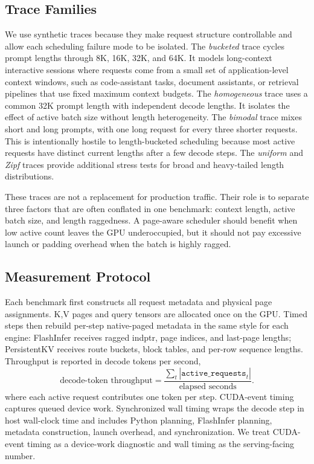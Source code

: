 \documentclass[10pt]{article}
\begin{document}
\subsection{Trace Families}

We use synthetic traces because they make request structure controllable and
allow each scheduling failure mode to be isolated. The \emph{bucketed} trace
cycles prompt lengths through 8K, 16K, 32K, and 64K. It models long-context
interactive sessions where requests come from a small set of application-level
context windows, such as code-assistant tasks, document assistants, or retrieval
pipelines that use fixed maximum context budgets. The \emph{homogeneous} trace
uses a common 32K prompt length with independent decode lengths. It isolates
the effect of active batch size without length heterogeneity. The
\emph{bimodal} trace mixes short and long prompts, with one long request for
every three shorter requests. This is intentionally hostile to length-bucketed
scheduling because most active requests have distinct current lengths after a
few decode steps. The \emph{uniform} and \emph{Zipf} traces provide additional
stress tests for broad and heavy-tailed length distributions.

These traces are not a replacement for production traffic. Their role is to
separate three factors that are often conflated in one benchmark: context
length, active batch size, and length raggedness. A page-aware scheduler should
benefit when low active count leaves the GPU underoccupied, but it should not
pay excessive launch or padding overhead when the batch is highly ragged.

\subsection{Measurement Protocol}

Each benchmark first constructs all request metadata and physical page
assignments. K,V pages and query tensors are allocated once on the GPU. Timed
steps then rebuild per-step native-paged metadata in the same style for each
engine: FlashInfer receives ragged indptr, page indices, and last-page lengths;
PersistentKV receives route buckets, block tables, and per-row sequence
lengths. Throughput is reported in decode tokens per second,
\[
\text{decode-token throughput} =
\frac{\sum_t |\texttt{active\_requests}_t|}{\text{elapsed seconds}}.
\]
where each active request contributes one token per step. CUDA-event timing
captures queued device work. Synchronized wall timing wraps the decode step in
host wall-clock time and includes Python planning, FlashInfer planning,
metadata construction, launch overhead, and synchronization. We treat
CUDA-event timing as a device-work diagnostic and wall timing as the
serving-facing number.
\end{document}
